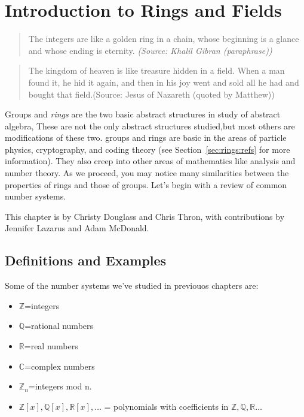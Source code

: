 \chapter{Introduction to Rings and Fields}\label{rings}

\begin{quote}
The integers are like a golden ring in a chain, whose beginning is a glance and whose ending is eternity.     
\emph{(Source:  Khalil Gibran (\emph{paraphrase}))}
\end{quote}

\begin{quote}
The kingdom of heaven is like treasure hidden in a field. When a man found it, he hid it again, and then in his joy went and sold all he had and bought that field.(Source:  Jesus of Nazareth (quoted by Matthew))
\end{quote}

Groups and  \emph{rings} are the two basic abstract structures in study of abstract algebra, These are not the only abstract structures studied,but most others are  modifications of these two. groups and rings are basic in the areas of particle physics, cryptography, and coding theory (see Section~\ref{sec:rings:refs} for more information). They also creep into other areas of mathematics like analysis and number theory.
 As we proceed, you may notice many similarities between the properties of rings and those of groups. Let's begin with a review of common number systems.

This chapter is by Christy Douglass and Chris Thron, with contributions by Jennifer Lazarus and Adam McDonald.

\section{Definitions and Examples \quad{}}
\label{sec:rings:Definitions and Examples}

Some of the number systems we've studied in previouos chapters are:
\begin{itemize}
\item ${\mathbb Z}$=integers
\item ${\mathbb Q}$=rational numbers
\item ${\mathbb R}$=real numbers
\item ${\mathbb C}$=complex numbers
\item ${\mathbb Z}_n$=integers mod n.
\item ${\mathbb Z}[x],  {\mathbb Q}[x], {\mathbb R}[x], \ldots$ = polynomials with coefficients in ${\mathbb Z, \mathbb Q, \mathbb R  \ldots}$     
\end{itemize}

